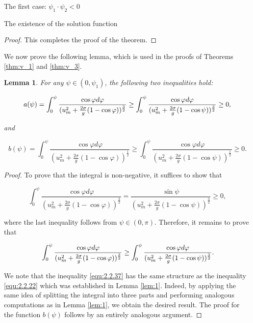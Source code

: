 \documentclass[letterpaper,reqno,10pt,twoside]{amsart}
\newtheorem{lemma}[theorem]{Lemma}
\theoremstyle{definition}
\theoremstyle{remark}
\begin{document}
\begin{section}{The first case: $\psi_1\cdot \psi_2<0$ }
\begin{subsection}{The existence of the solution function}
\begin{proof}
        \noindent This completes the proof of the theorem.
    \end{proof}

   We now prove the following lemma, which is used in the proofs of Theorems \ref{thm:v_1} and \ref{thm:v_3}.
   
    \begin{lemma}

     For any $\psi\in(0,\psi_1)$, the following two inequalities hold:

     \begin{equation}{\label{equ:2.2.36}}
         a(\psi)=\int_{0}^{\psi}\frac{\cos\varphi d\varphi }{(u_m^{2}+\frac{2\sigma}{g}(1-\cos\varphi))^{\frac{3}{2}}}\geq \int_{0}^{\psi}\frac{\cos\varphi d\varphi}{(u_m^{2}+\frac{2\sigma}{g}(1-\cos\psi))^{\frac{3}{2}}}\geq 0,
     \end{equation}

     \noindent and

     \begin{equation*}
         b(\psi)=\int_{0}^{\psi}\frac{\cos\varphi d\varphi }{(u_m^{2}+\frac{2\sigma}{g}(1-\cos\varphi))^{\frac{1}{2}}}\geq \int_{0}^{\psi}\frac{\cos\varphi d\varphi}{(u_m^{2}+\frac{2\sigma}{g}(1-\cos\psi))^{\frac{1}{2}}}\geq 0.
     \end{equation*}
     \end{lemma}

    \begin{proof}

    To prove that the integral is non-negative, it suffices to show that

    \begin{equation*}
        \int_{0}^{\psi}\frac{\cos\varphi d\varphi}{(u_m^{2}+\frac{2\sigma}{g}(1-\cos\varphi))^{\frac{3}{2}}}=\frac{\sin\psi}{(u_m^{2}+\frac{2\sigma}{g}(1-\cos\psi))^{\frac{3}{2}}}\geq 0,
    \end{equation*}

    \noindent where the last inequality follows from $\psi\in(0,\pi)$. Therefore, it remains to prove that

    \begin{equation}{\label{equ:2.2.37}}
         \int_{0}^{\psi}\frac{\cos\varphi d\varphi }{(u_m^{2}+\frac{2\sigma}{g}(1-\cos\varphi))^{\frac{3}{2}}}\geq \int_{0}^{\psi}\frac{\cos\varphi d\varphi}{(u_m^{2}+\frac{2\sigma}{g}(1-\cos\psi))^{\frac{3}{2}}}.
    \end{equation}

    We note that the inequality \eqref{equ:2.2.37} has the same structure as the inequality \eqref{equ:2.2.22} which was established in Lemma \ref{lem:1}. Indeed, by applying the same idea of splitting the integral into three parts and performing analogous computations as in Lemma \ref{lem:1}, we obtain the desired result. The proof for the function $b(\psi)$ follows by an entirely analogous argument.
    

\end{proof}
\end{subsection}
\end{section}
\end{document}
